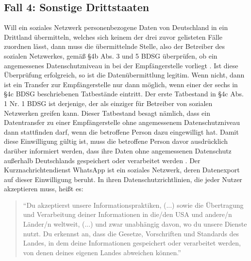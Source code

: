 \subsection{Fall 4: Sonstige Drittstaaten}
Will ein soziales Netzwerk personenbezogene Daten von Deutschland in ein Drittland übermitteln, welches sich keinem der drei zuvor gelisteten Fälle zuordnen lässt, dann muss die übermittelnde Stelle, also der Betreiber des sozialen Netzwerkes, gemäß §4b Abs. 3 und 5 BDSG überprüfen, ob ein angemessenes Datenschutzniveau in bei der Empfängerstelle vorliegt \autocite[vgl.][]{LDI.2017}. Ist diese Überprüfung erfolgreich, so ist die Datenübermittlung legitim. Wenn nicht, dann ist ein Transfer zur Empfängerstelle nur dann möglich, wenn einer der sechs in §4c BDSG beschriebenen Tatbestände eintritt. Der erste Tatbestand in §4c Abs. 1 Nr. 1 BDSG ist derjenige, der als einziger für Betreiber von sozialen Netzwerken greifen kann. Dieser Tatbestand besagt nämlich, dass ein Datentransfer zu einer Empfängerstelle ohne angemessenem Datenschutzniveau dann stattfinden darf, wenn die betroffene Person dazu eingewilligt hat. Damit diese Einwilligung gültig ist, muss die betroffene Person davor ausdrücklich darüber informiert werden, dass ihre Daten ohne angemessenen Datenschutz außerhalb Deutschlands gespeichert oder verarbeitet werden \autocite[vgl.][]{LDI.2017}. Der Kurznachrichtendienst WhatsApp ist ein soziales Netzwerk, deren Datenexport auf dieser Einwilligung beruht. In ihren Datenschutzrichtlinien, die jeder Nutzer akzeptieren muss, heißt es: 
\begin{quotation}
	"`Du akzeptierst unsere Informationspraktiken, (...) sowie die Übertragung und Verarbeitung deiner Informationen in die/den USA und andere/n Länder/n weltweit, (...) und zwar unabhängig davon, wo du unsere Dienste nutzt. Du erkennst an, dass die Gesetze, Vorschriften und Standards des Landes, in dem deine Informationen gespeichert oder verarbeitet werden, von denen deines eigenen Landes abweichen können."' \autocite[][]{WhatsAppInc..2017}
\end{quotation}

